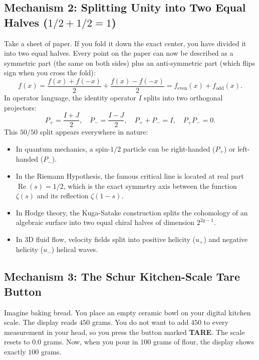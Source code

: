 \documentclass[11pt,a4paper]{article}
\theoremstyle{definition}
\begin{document}
\subsection{Mechanism 2: Splitting Unity into Two Equal Halves ($1/2 + 1/2 = 1$)}
Take a sheet of paper. If you fold it down the exact center, you have divided it into two equal halves. Every point on the paper can now be described as a symmetric part (the same on both sides) plus an anti-symmetric part (which flips sign when you cross the fold):
\begin{equation}
f(x) = \frac{f(x) + f(-x)}{2} + \frac{f(x) - f(-x)}{2} = f_{\mathrm{even}}(x) + f_{\mathrm{odd}}(x).
\end{equation}
In operator language, the identity operator $I$ splits into two orthogonal projectors:
\begin{equation}
P_+ = \frac{I + J}{2}, \quad P_- = \frac{I - J}{2}, \quad P_+ + P_- = I, \quad P_+ P_- = 0.
\end{equation}
This $50/50$ split appears everywhere in nature:
\begin{itemize}
    \item In quantum mechanics, a spin-$1/2$ particle can be right-handed ($P_+$) or left-handed ($P_-$).
    \item In the Riemann Hypothesis, the famous critical line is located at real part $\operatorname{Re}(s) = 1/2$, which is the exact symmetry axis between the function $\zeta(s)$ and its reflection $\zeta(1-s)$.
    \item In Hodge theory, the Kuga-Satake construction splits the cohomology of an algebraic surface into two equal chiral halves of dimension $2^{2g-1}$.
    \item In 3D fluid flow, velocity fields split into positive helicity ($u_+$) and negative helicity ($u_-$) helical waves.
\end{itemize}

\subsection{Mechanism 3: The Schur Kitchen-Scale Tare Button}
Imagine baking bread. You place an empty ceramic bowl on your digital kitchen scale. The display reads $450$ grams. You do not want to add $450$ to every measurement in your head, so you press the button marked \textbf{TARE}. The scale resets to $0.0$ grams. Now, when you pour in $100$ grams of flour, the display shows exactly $100$ grams.
\end{document}
